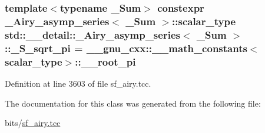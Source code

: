 \subsubsection[{\texorpdfstring{\+\_\+\+S\+\_\+sqrt\+\_\+pi}{_S_sqrt_pi}}]{\setlength{\rightskip}{0pt plus 5cm}template$<$typename \+\_\+\+Sum$>$ constexpr {\bf \+\_\+\+Airy\+\_\+asymp\+\_\+series}$<$ \+\_\+\+Sum $>$\+::{\bf scalar\+\_\+type} {\bf std\+::\+\_\+\+\_\+detail\+::\+\_\+\+Airy\+\_\+asymp\+\_\+series}$<$ \+\_\+\+Sum $>$\+::\+\_\+\+S\+\_\+sqrt\+\_\+pi = \+\_\+\+\_\+gnu\+\_\+cxx\+::\+\_\+\+\_\+math\+\_\+constants$<${\bf scalar\+\_\+type}$>$\+::\+\_\+\+\_\+root\+\_\+pi\hspace{0.3cm}{\ttfamily [static]}}\hypertarget{classstd_1_1____detail_1_1__Airy__asymp__series_a0a4d017f86429e22f5939e689e7b93ca}{}\label{classstd_1_1____detail_1_1__Airy__asymp__series_a0a4d017f86429e22f5939e689e7b93ca}


Definition at line 3603 of file sf\+\_\+airy.\+tcc.



The documentation for this class was generated from the following file\+:\begin{DoxyCompactItemize}
\item 
bits/\hyperlink{sf__airy_8tcc}{sf\+\_\+airy.\+tcc}\end{DoxyCompactItemize}
